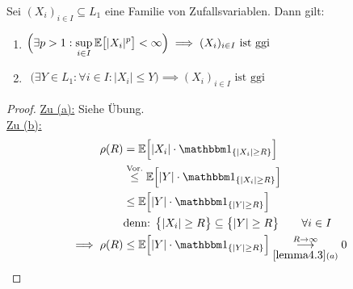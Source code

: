 \begin{theorem}\label{theorem4.4HinreichendeBeingungenFuerggi}\enter
Sei $(X_i)_{i\in I}\subseteq L_1$ eine Familie von Zufallsvariablen. Dann gilt:
\begin{enumerate}[label=(\alph*)]
\item $\begin{aligned}
\Big(\exists p>1:\sup\limits_{i\in I}\mathbb{E}\big[|X_i|^p\big]<\infty\Big)\implies (X_i)_{i\in I}\text{ ist ggi}
\end{aligned}$
\item $\begin{aligned}
\Big(\exists Y\in L_1:\forall i\in I:|X_i|\leq Y\Big)\implies(X_i)_{i\in I}\text{ ist ggi}
\end{aligned}$
\end{enumerate}
\end{theorem}
\begin{proof}
\underline{Zu (a):} Siehe Übung.\\

\underline{Zu (b):}
\begin{align*}
	\rho(R)&=\E\Big[|X_i|\cdot\indi_{\lbrace |X_i|\geq R\rbrace}\Big] \\
&\stackrel{\text{Vor.}}{\leq} \E\Big[|Y|\cdot\indi_{\lbrace |X_i|\geq R\rbrace}\Big] \\
&\leq\E\Big[|Y|\cdot\indi_{\lbrace |Y|\geq R\rbrace}\Big]\\
&\text{denn: }\big\lbrace |X_i|\geq R\big\rbrace\subseteq\big\lbrace|Y|\geq R\big\rbrace\qquad\forall i\in I\\
\implies
\rho(R)
&\leq\E\Big[|Y|\cdot\indi_{\lbrace |Y|\geq R\rbrace}\Big]\underset{\ref{lemma4.3} (a)}{\overset{R\to\infty}{\longrightarrow}}0
\end{align*}
\end{proof}

